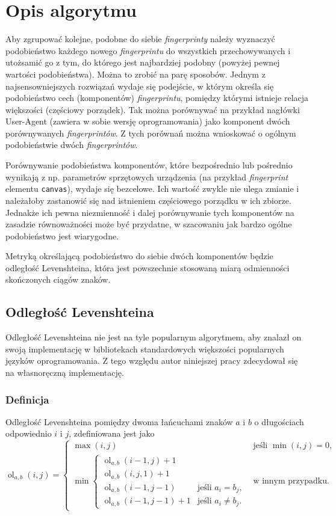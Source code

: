 \section{Opis algorytmu}
Aby zgrupować kolejne, podobne do siebie \emph{fingerprinty} należy wyznaczyć
podobieństwo każdego nowego \emph{fingerprintu} do wszystkich przechowywanych i
utożsamić go z tym, do którego jest najbardziej podobny (powyżej pewnej wartości
podobieństwa). Można to zrobić na parę sposobów. Jednym z najsensowniejszych
rozwiązań wydaje się podejście, w którym określa się podobieństwo cech
(komponentów) \emph{fingerprintu}, pomiędzy którymi istnieje relacja większości
(częściowy porządek). Tak można porównywać na przykład nagłówki User-Agent
(zawiera w sobie wersję oprogramowania) jako komponent dwóch porównywanych
\emph{fingerprintów}. Z tych porównań można wnioskować o ogólnym podobieństwie
dwóch \emph{fingerprintów}.

Porównywanie podobieństwa komponentów, które bezpośrednio lub pośrednio wynikają
z np. parametrów sprzętowych urządzenia (na przykład \emph{fingerprint} elementu
\texttt{canvas}), wydaje się bezcelowe. Ich wartość zwykle nie ulega zmianie i
należałoby zastanowić się nad istnieniem częściowego porządku w ich zbiorze.
Jednakże ich pewna niezmienność i dalej porównywanie tych komponentów na
zasadzie równoważności może być przydatne, w szacowaniu jak bardzo ogólne
podobieństwo jest wiarygodne.

Metryką określającą podobieństwo do siebie dwóch komponentów będzie odległość
Levenshteina, która jest powszechnie stosowaną miarą odmienności skończonych
ciągów znaków.

\subsection{Odległość Levenshteina}
Odległość Levenshteina nie jest na tyle popularnym algorytmem, aby znalazł on
swoją implementację w bibliotekach standardowych większości popularnych języków
oprogramowania. Z tego względu autor niniejszej pracy zdecydował się na
własnoręczną implementację.

\subsubsection{Definicja}
Odległość Levenshteina pomiędzy dwoma łańcuchami znaków \(a\) i \(b\) o
długościach odpowiednio \(i\) i \(j\), zdefiniowana jest jako
\begin{displaymath}
	\operatorname{ol}_{a,b}(i,j)=
	\begin{cases}
		\max(i,j)                          & \text{jeśli }\min(i,j)=0,  \\
		\min
		\begin{cases}
		\operatorname{ol}_{a,b}(i-1,j)+1 \\
		\operatorname{ol}_{a,b}(i,j,1)+1 \\
		\operatorname{ol}_{a,b}(i-1,j-1)   & \text{jeśli }a_i=b_j,      \\
		\operatorname{ol}_{a,b}(i-1,j-1)+1 & \text{jeśli }a_i \neq b_j. 
	\end{cases} & \text{w innym przypadku}.
	\end{cases}
\end{displaymath}

